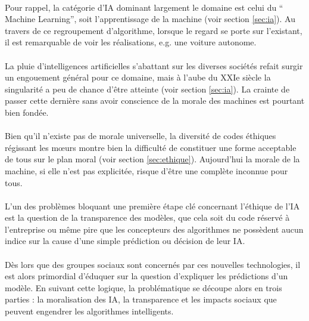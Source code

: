 \documentclass[10pt, french, a4paper]{report}
\begin{document}
\paragraph{}
Pour rappel, la catégorie d’IA dominant largement le domaine est celui du `` Machine Learning'', soit l’apprentissage de la machine (voir section \ref{sec:ia}). Au travers de ce regroupement d’algorithme, lorsque le regard se porte sur l’existant, il est remarquable de voir les réalisations, e.g. une voiture autonome.

\paragraph{}
La pluie d’intelligences artificielles s’abattant sur les diverses sociétés refait surgir un engouement général pour ce domaine, mais à l’aube du XXIe siècle la singularité a peu de chance d’être atteinte (voir section \ref{sec:ia}). La crainte de passer cette dernière sans avoir conscience de la morale des machines est pourtant bien fondée.

\paragraph{}
Bien qu’il n’existe pas de morale universelle, la diversité de codes éthiques régissant les mœurs montre bien la difficulté de constituer une forme acceptable de tous sur le plan moral (voir section \ref{sec:ethique}). Aujourd’hui la morale de la machine, si elle n’est pas explicitée, risque d’être une complète inconnue pour tous.

\paragraph{}
L’un des problèmes bloquant une première étape clé concernant l’éthique de l’IA est la question de la transparence des modèles, que cela soit du code réservé à l’entreprise ou même pire que les concepteurs des algorithmes ne possèdent aucun indice sur la cause d’une simple prédiction ou décision de leur IA.

\paragraph{}
Dès lors que des groupes sociaux sont concernés par ces nouvelles technologies, il est alors primordial d’éduquer sur la question d’expliquer les prédictions d’un modèle. En suivant cette logique, la problématique se découpe alors en trois parties : la moralisation des IA, la transparence et les impacts sociaux que peuvent engendrer les algorithmes intelligents.
\end{document}
